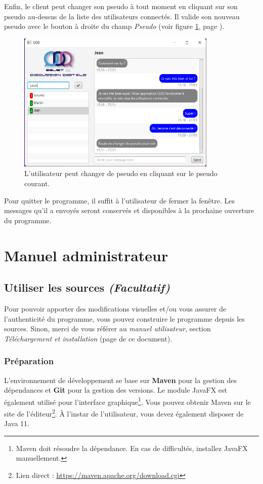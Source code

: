 \documentclass[12pt, a4paper]{article}
\begin{document}
    \newpage
    Enfin, le client peut changer son pseudo à tout moment en cliquant sur son pseudo au-dessus de la liste des utilisateurs connectés. Il valide son nouveau pseudo avec le bouton à droite du champ \textit{Pseudo} (voir figure \ref{ps}, page \pageref{ps}).
    
    \begin{figure}[!htp]
        \centering
        \includegraphics[width=0.85\textwidth]{img/mw/ps_window.png}
        \caption{L'utilisateur peut changer de pseudo en cliquant sur le pseudo courant.}
        \label{ps}
    \end{figure}
    
    Pour quitter le programme, il suffit à l'utilisateur de fermer la fenêtre. Les messages qu'il a envoyés seront conservés et disponibles à la prochaine ouverture du programme.
    
    
    \newpage
    \section{Manuel administrateur}
    
    \subsection{Utiliser les sources \textit{(Facultatif)}}
    Pour pouvoir apporter des modifications visuelles et/ou vous assurer de l'authenticité du programme, vous pouvez construire le programme depuis les sources. Sinon, merci de vous référer au \textit{manuel utilisateur}, section \textit{Téléchargement et installation} (page \pageref{install} de ce document).
    
    \subsubsection{Préparation}
    L'environnement de développement se base sur \textbf{Maven} pour la gestion des dépendances et \textbf{Git} pour la gestion des versions. Le module JavaFX est également utilisé pour l'interface graphique\footnote{Maven doit résoudre la dépendance. En cas de difficultés, installez JavaFX manuellement.}. Vous pouvez obtenir Maven sur le site de l'éditeur\footnote{Lien direct : \url{https://maven.apache.org/download.cgi}}. À l'instar de l'utilisateur, vous devez également disposer de Java 11.\\
    
\end{document}
